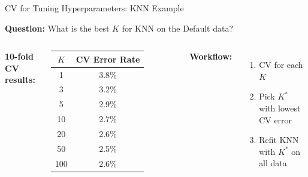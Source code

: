 \documentclass[aspectratio=169, 11pt]{beamer}
\begin{document}
\begin{frame}{CV for Tuning Hyperparameters: KNN Example}

\textbf{Question:} What is the best $K$ for KNN on the Default data?

\vspace{0.3em}
\begin{columns}
\textbf{10-fold CV results:}

\begin{tabular}{cc}
\toprule
$K$ & CV Error Rate \\
\midrule
1 & 3.8\% \\
3 & 3.2\% \\
5 & 2.9\% \\
10 & 2.7\% \\
20 & 2.6\% \\
\textcolor{softgreen}{50} & \textcolor{softgreen}{2.5\%} \\
100 & 2.6\% \\
\bottomrule
\end{tabular}


\vspace{0.3em}
\textbf{Workflow:}

\begin{enumerate}
  \item CV for each $K$
  \item Pick $K^*$ with lowest CV error
  \item Refit KNN with $K^*$ on all data
\end{enumerate}
\end{columns}
\end{frame}
\end{document}
